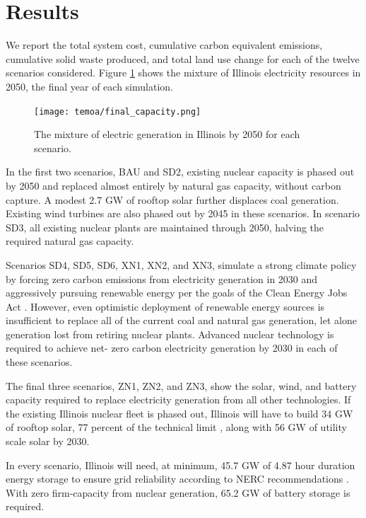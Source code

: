 \section{Results}

We report the total system cost, cumulative carbon equivalent emissions,
cumulative solid waste produced, and total land use change for each of the
twelve scenarios considered. Figure \ref{fig:cap-2050} shows the mixture of
Illinois electricity resources in 2050, the final year of each simulation.

\begin{figure}[H]
  \centering
  \texttt{[image: temoa/final\_capacity.png]}
  \caption{The mixture of electric generation in Illinois by 2050 for each scenario.}
  \label{fig:cap-2050}
\end{figure}

In the first two scenarios, BAU and SD2, existing nuclear capacity is phased out
by 2050 and replaced almost entirely by natural gas capacity, without carbon
capture. A modest 2.7 GW of rooftop solar further displaces coal generation.
Existing wind turbines are also phased out by 2045 in these scenarios. In
scenario SD3, all existing nuclear plants are maintained through 2050, halving
the required natural gas capacity.

Scenarios SD4, SD5, SD6, XN1, XN2, and XN3, simulate a strong climate policy by
forcing zero carbon emissions from electricity generation in 2030 and
aggressively pursuing renewable energy per the goals of the Clean Energy Jobs
Act \cite{illinois_clean_jobs_coalition_clean_2021}. However, even optimistic
deployment of renewable energy sources is insufficient to replace all of the
current coal and natural gas generation, let alone generation lost from
retiring nuclear plants. Advanced nuclear technology is required to achieve net-
zero carbon electricity generation by 2030 in each of these scenarios.

The final three scenarios, ZN1, ZN2, and ZN3, show the solar, wind, and battery
capacity required to replace electricity generation from all other technologies.
If the existing Illinois nuclear fleet is phased out, Illinois will have to
build 34 GW of rooftop solar, 77 percent of the technical limit \cite{gagnon_rooftop_2016}, along with 56 GW of utility scale solar by 2030.

In every scenario, Illinois will need, at minimum, 45.7 GW of 4.87 hour duration
energy storage to ensure grid reliability according to NERC recommendations
\cite{milligan_methods_2011}. With zero firm-capacity from nuclear
generation, 65.2 GW of battery storage is required.


